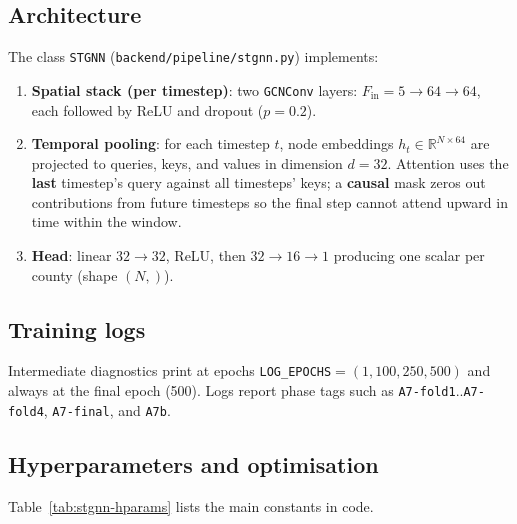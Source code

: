 \documentclass[11pt,a4paper]{article}
\begin{document}
\subsection{Architecture}
The class \texttt{STGNN} (\texttt{backend/pipeline/stgnn.py}) implements:
\begin{enumerate}
  \item \textbf{Spatial stack (per timestep)}: two \texttt{GCNConv} layers: $F_{\mathrm{in}}{=}5 \rightarrow 64 \rightarrow 64$, each followed by ReLU and dropout ($p{=}0.2$).
  \item \textbf{Temporal pooling}: for each timestep $t$, node embeddings $h_t \in \mathbb{R}^{N \times 64}$ are projected to queries, keys, and values in dimension $d{=}32$. Attention uses the \textbf{last} timestep's query against all timesteps' keys; a \textbf{causal} mask zeros out contributions from future timesteps so the final step cannot attend upward in time within the window.
  \item \textbf{Head}: linear $32\rightarrow32$, ReLU, then $32\rightarrow16\rightarrow1$ producing one scalar per county (shape $(N,)$).
\end{enumerate}

\subsection{Training logs}
Intermediate diagnostics print at epochs \texttt{LOG\_EPOCHS}${}=(1,100,250,500)$ and always at the final epoch (500). Logs report phase tags such as \texttt{A7-fold1}..\texttt{A7-fold4}, \texttt{A7-final}, and \texttt{A7b}.

\subsection{Hyperparameters and optimisation}
Table~\ref{tab:stgnn-hparams} lists the main constants in code.
\end{document}

